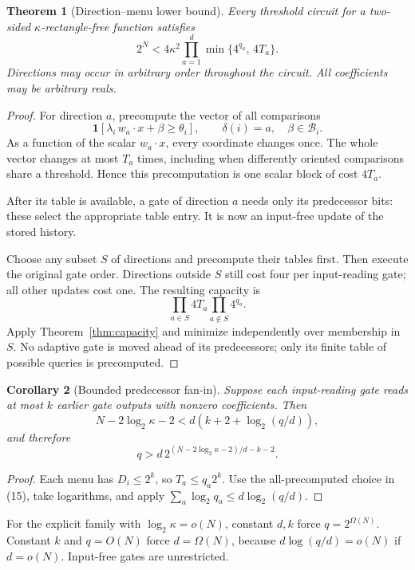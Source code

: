 \documentclass[11pt]{article}
\newtheorem{theorem}{Theorem}[section]
\newtheorem{corollary}[theorem]{Corollary}
\theoremstyle{definition}
\newcommand{\ind}[1]{\mathbf 1[#1]}
\begin{document}
\begin{theorem}[Direction--menu lower bound]\label{thm:menus}
Every threshold circuit for a two-sided \(\kappa\)-rectangle-free function satisfies
\[
 \boxed{\quad
 2^N<4\kappa^2\prod_{a=1}^d\min\{4^{q_a},\,4T_a\}.
 \quad}                                                  \tag{15}
\]
Directions may occur in arbitrary order throughout the circuit. All coefficients may be arbitrary reals.
\end{theorem}
\begin{proof}
For direction \(a\), precompute the vector of all comparisons
\[
 \ind{\lambda_i\,w_a\cdot x+\beta\ge\theta_i},
 \qquad \delta(i)=a,\quad\beta\in\mathcal B_i.
\]
As a function of the scalar \(w_a\cdot x\), every coordinate changes once. The whole vector changes at most \(T_a\) times, including when differently oriented comparisons share a threshold. Hence this precomputation is one scalar block of cost \(4T_a\).

After its table is available, a gate of direction \(a\) needs only its predecessor bits: these select the appropriate table entry. It is now an input-free update of the stored history.

Choose any subset \(S\) of directions and precompute their tables first. Then execute the original gate order. Directions outside \(S\) still cost four per input-reading gate; all other updates cost one. The resulting capacity is
\[
 \prod_{a\in S}4T_a\prod_{a\notin S}4^{q_a}.
\]
Apply Theorem~\ref{thm:capacity} and minimize independently over membership in \(S\). No adaptive gate is moved ahead of its predecessors; only its finite table of possible queries is precomputed.
\end{proof}

\begin{corollary}[Bounded predecessor fan-in]\label{cor:menusfanin}
Suppose each input-reading gate reads at most \(k\) earlier gate outputs with nonzero coefficients. Then
\[
 N-2\log_2\kappa-2
 <d\left(k+2+\log_2(q/d)\right),                         \tag{16}
\]
and therefore
\[
 q>d\,2^{(N-2\log_2\kappa-2)/d-k-2}.                     \tag{17}
\]
\end{corollary}
\begin{proof}
Each menu has \(D_i\le2^k\), so \(T_a\le q_a2^k\). Use the all-precomputed choice in (15), take logarithms, and apply
\(\sum_a\log_2q_a\le d\log_2(q/d)\).
\end{proof}
For the explicit family with \(\log_2\kappa=o(N)\), constant \(d,k\) force \(q=2^{\Omega(N)}\). Constant \(k\) and \(q=O(N)\) force \(d=\Omega(N)\), because \(d\log(q/d)=o(N)\) if \(d=o(N)\). Input-free gates are unrestricted.
\end{document}
